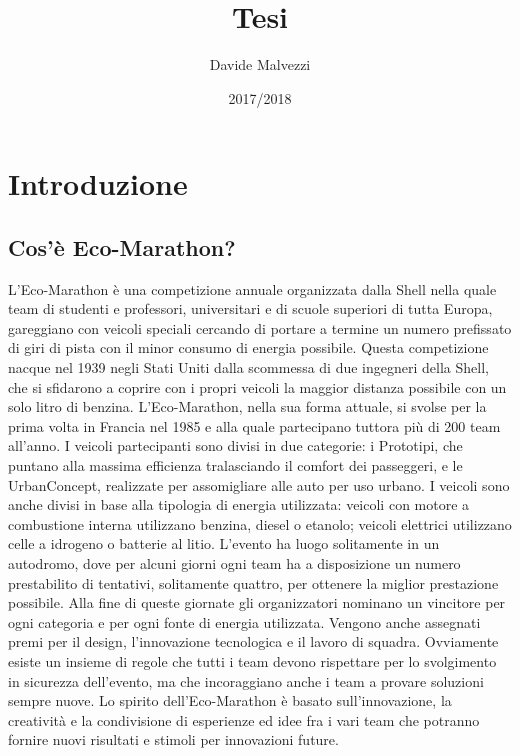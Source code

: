 \documentclass[12pt,a4paper]{article}
\begin{document}
\title{Tesi}
\author{Davide Malvezzi}
\date{2017/2018}
\maketitle
\newpage

\tableofcontents
\newpage

\section{Introduzione}
\subsection{Cos'è Eco-Marathon?}
L’Eco-Marathon è una competizione annuale organizzata dalla Shell nella quale team di studenti e professori, universitari e di scuole superiori di tutta Europa, gareggiano con veicoli speciali cercando di portare a termine un numero prefissato di giri di pista con il minor consumo di energia possibile. 
Questa competizione nacque nel 1939 negli Stati Uniti dalla scommessa di due ingegneri della Shell, che si sfidarono a coprire con i propri veicoli la maggior distanza possibile con un solo litro di benzina. L’Eco-Marathon, nella sua forma attuale, si svolse per la prima volta in Francia nel 1985 e alla quale partecipano tuttora più di 200 team all’anno. I veicoli partecipanti sono divisi in due categorie: i Prototipi, che puntano alla massima efficienza tralasciando il comfort dei passeggeri, e le UrbanConcept, realizzate per assomigliare alle auto per uso urbano. 
I veicoli sono anche divisi in base alla tipologia di energia utilizzata:
veicoli con motore a combustione interna utilizzano benzina, diesel o etanolo;
veicoli elettrici utilizzano celle a idrogeno o batterie al litio.
L’evento ha luogo solitamente in un autodromo, dove per alcuni giorni ogni team ha a disposizione un numero prestabilito di tentativi, solitamente quattro, per ottenere la miglior prestazione possibile. Alla fine di queste giornate gli organizzatori nominano un vincitore per ogni categoria e per ogni fonte di energia utilizzata. Vengono anche assegnati premi per il design, l’innovazione tecnologica e il lavoro di squadra. Ovviamente esiste un insieme di regole che tutti i team devono rispettare per lo svolgimento in sicurezza dell’evento, ma che incoraggiano anche i team a provare soluzioni sempre nuove. Lo spirito dell’Eco-Marathon è basato sull’innovazione, la creatività e la condivisione di esperienze ed idee fra i vari team che potranno fornire nuovi risultati e stimoli per innovazioni future.
\newpage
\end{document}
